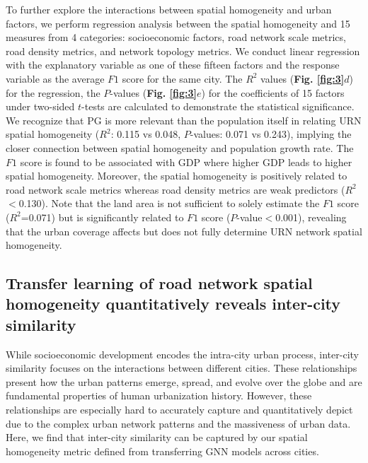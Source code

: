\documentclass[10pt]{wlscirep}
\begin{document}
To further explore the interactions between spatial homogeneity and urban factors, we perform regression analysis between the spatial homogeneity and 15 measures from 4 categories: socioeconomic factors, road network scale metrics, road density metrics, and network topology metrics. We conduct linear regression with the explanatory variable as one of these fifteen factors and the response variable as the average $F1$ score for the same city. The $R^{2}$ values (\textbf{Fig. \ref{fig:3}$d$}) for the regression, the $P$-values (\textbf{Fig. \ref{fig:3}$e$}) for the coefficients of 15 factors under two-sided $t$-tests are calculated to demonstrate the statistical significance. We recognize that PG is more relevant than the population itself in relating URN spatial homogeneity ($R^{2}$: 0.115 vs 0.048, $P$-values: 0.071 vs 0.243), implying the closer connection between spatial homogeneity and population growth rate. The $F1$ score is found to be associated with GDP where higher GDP leads to higher spatial homogeneity. Moreover, the spatial homogeneity is positively related to road network scale metrics whereas road density metrics are weak predictors ($R^{2}$ $<$0.130). Note that the land area is not sufficient to solely estimate the $F1$ score ($R^{2}$=0.071) but is significantly related to $F1$ score ($P$-value$<$0.001), revealing that the urban coverage affects but does not fully determine URN network spatial homogeneity.



\subsection*{Transfer learning of road network spatial homogeneity quantitatively reveals inter-city similarity}
While socioeconomic development encodes the intra-city urban process, inter-city similarity focuses
on the interactions between different cities. 
These relationships present how the urban patterns emerge, spread, and evolve over the globe and are fundamental properties of human urbanization history. However, these relationships are especially hard to accurately capture and quantitatively depict due to the complex urban network patterns and the massiveness of urban data. Here, we find that inter-city similarity can be captured by our spatial homogeneity metric defined from transferring GNN models across cities.  
\end{document}
